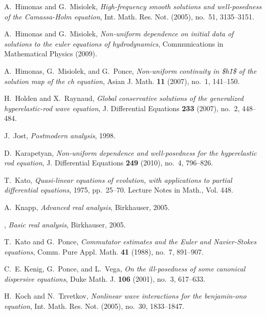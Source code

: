 \documentclass[final]{nddiss2e}
\begin{document}
\begin{thebibliography}{HKM09}
A.~Himonas and G.~Misiolek, \emph{High-frequency smooth solutions and
  well-posedness of the {C}amassa-{H}olm equation}, Int. Math. Res. Not.
  (2005), no.~51, 3135--3151. 

A.~Himonas and G.~Misiolek, \emph{Non-uniform dependence on initial data of
  solutions to the euler equations of hydrodynamics}, Communications in
  Mathematical Physics (2009).

A.~Himonas, G.~Misiolek, and G.~Ponce, \emph{Non-uniform continuity in {\$}h\^
  1{\$} of the solution map of the ch equation}, Asian J. Math. \textbf{11}
  (2007), no.~1, 141--150.

H.~Holden and X.~Raynaud, \emph{Global conservative solutions of the
  generalized hyperelastic-rod wave equation}, J. Differential Equations
  \textbf{233} (2007), no.~2, 448--484.

J.~Jost, \emph{Postmodern analysis}, 1998.

D.~Karapetyan, \emph{Non-uniform dependence and well-posedness for the
  hyperelastic rod equation}, J. Differential Equations \textbf{249} (2010),
  no.~4, 796--826. 

T.~Kato, \emph{Quasi-linear equations of evolution, with applications to
  partial differential equations}, 1975, pp.~25--70. Lecture Notes in Math.,
  Vol. 448.

A.~Knapp, \emph{Advanced real analysis}, Birkhauser, 2005.

\bysame, \emph{Basic real analysis}, Birkhauser, 2005.

T.~Kato and G.~Ponce, \emph{Commutator estimates and the {E}uler and
  {N}avier-{S}tokes equations}, Comm. Pure Appl. Math. \textbf{41} (1988),
  no.~7, 891--907. 

C.~E. Kenig, G.~Ponce, and L.~Vega, \emph{On the ill-posedness of some
  canonical dispersive equations}, Duke Math. J. \textbf{106} (2001), no.~3,
  617--633.

H.~Koch and N.~Tzvetkov, \emph{Nonlinear wave interactions for the benjamin-ono
  equation}, Int. Math. Res. Not. (2005), no.~30, 1833--1847.


\end{thebibliography}
\end{document}
